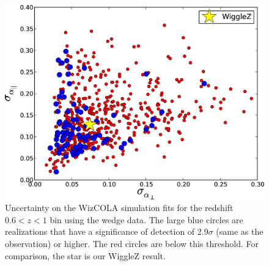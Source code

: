 \documentclass[a4paper,fleqn,usenatbib]{mnras}
\begin{document}
\begin{figure}
\begin{center}
\includegraphics[width=\columnwidth]{WiZCOLA_unc_z0pt6_1pt0.png}
\caption{\label{fig:wizcola_hdaUnc_z60_epsilonT15} Uncertainty on the WizCOLA simulation fits for the redshift $0.6<z<1$ bin using the wedge data. The large blue circles are realizations that have a significance of detection of 2.9$\sigma$ (same as the observation) or higher. The red circles are below this threshold. For comparison, the star is our WiggleZ result.%
}
\end{center}
\end{figure}
\end{document}
